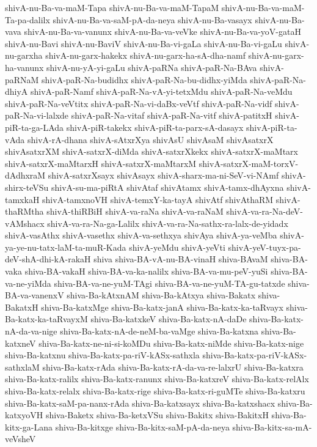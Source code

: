 {shivA-nu-Ba-va-maM-Tapa
shivA-nu-Ba-va-maM-TapaM
shivA-nu-Ba-va-maM-Ta-pa-dalilx
shivA-nu-Ba-va-saM-pA-da-neya
shivA-nu-Ba-vasayx
shivA-nu-Ba-vava
shivA-nu-Ba-va-vanunx
shivA-nu-Ba-va-veVke
shivA-nu-Ba-va-yoV-gataH
shivA-nu-Bavi
shivA-nu-BaviV
shivA-nu-Ba-vi-gaLa
shivA-nu-Ba-vi-gaLu
shivA-nu-garxha
shivA-nu-garx-hakekx
shivA-nu-garx-ha-sA-dha-namf
shivA-nu-garx-ha-vanunx
shivA-nu-yA-yi-gaLu
shivA-paRNa
shivA-paR-Na-BAva
shivA-paRNaM
shivA-paR-Na-budidhx
shivA-paR-Na-bu-didhx-yiMda
shivA-paR-Na-dhiyA
shivA-paR-Namf
shivA-paR-Na-vA-yi-tetxMdu
shivA-paR-Na-veMdu
shivA-paR-Na-veVtitx
shivA-paR-Na-vi-daBx-veVtf
shivA-paR-Na-vidf
shivA-paR-Na-vi-lalxde
shivA-paR-Na-vitaf
shivA-paR-Na-vitf
shivA-patitxH
shivA-piR-ta-ga-LAda
shivA-piR-takekx
shivA-piR-ta-parx-sA-dasayx
shivA-piR-ta-vAda
shivA-rA-dhana
shivA-sAtxrXya
shivAsU
shivAsaM
shivAsatxrX
shivAsatxrXM
shivA-satxrX-diMda
shivA-satxrXkekx
shivA-satxrX-maMtarx
shivA-satxrX-maMtarxH
shivA-satxrX-maMtarxM
shivA-satxrX-maM-torxV-dAdhxraM
shivA-satxrXsayx
shivAsayx
shivA-sharx-ma-ni-SeV-vi-NAmf
shivA-shirx-teVSu
shivA-su-ma-piRtA
shivAtaf
shivAtamx
shivA-tamx-dhAyxna
shivA-tamxkaH
shivA-tamxnoVH
shivA-temxY-ka-tayA
shivAtf
shivAthaRM
shivA-thaRMtha
shivA-thiRBiH
shivA-va-raNa
shivA-va-raNaM
shivA-va-ra-Na-deV-vAMshacx
shivA-va-ra-Na-ga-Lalilx
shivA-va-ra-Na-sathx-ra-lalx-de-yidadx
shivA-vasAthx
shivA-vasethx
shivA-va-sethxya
shivAya
shivA-ya-veMba
shivA-ya-ye-nu-tatx-laM-ta-muR-Kada
shivA-yeMdu
shivA-yeVti
shivA-yeV-tuyx-pa-deV-shA-dhi-kA-rakaH
shiva
shiva-BA-vA-nu-BA-vinaH
shiva-BAvaM
shiva-BA-vaka
shiva-BA-vakaH
shiva-BA-va-ka-nalilx
shiva-BA-va-mu-peV-yuSi
shiva-BA-va-ne-yiMda
shiva-BA-va-ne-yuM-TAgi
shiva-BA-va-ne-yuM-TA-gu-tatxde
shiva-BA-va-vanenxV
shiva-Ba-kAtxnAM
shiva-Ba-kAtxya
shiva-Bakatx
shiva-BakatxH
shiva-Ba-katxMge
shiva-Ba-katx-janA
shiva-Ba-katx-ka-taRvayx
shiva-Ba-katx-ka-taRvayxM
shiva-Ba-katxkeV
shiva-Ba-katx-nA-daDe
shiva-Ba-katx-nA-da-va-nige
shiva-Ba-katx-nA-de-neM-ba-vaMge
shiva-Ba-katxna
shiva-Ba-katxneV
shiva-Ba-katx-ne-ni-si-koMDu
shiva-Ba-katx-niMde
shiva-Ba-katx-nige
shiva-Ba-katxnu
shiva-Ba-katx-pa-riV-kASx-sathxla
shiva-Ba-katx-pa-riV-kASx-sathxlaM
shiva-Ba-katx-rAda
shiva-Ba-katx-rA-da-va-re-lalxrU
shiva-Ba-katxra
shiva-Ba-katx-ralilx
shiva-Ba-katx-ranunx
shiva-Ba-katxreV
shiva-Ba-katx-relAlx
shiva-Ba-katx-relalx
shiva-Ba-katx-rige
shiva-Ba-katx-ri-guMTe
shiva-Ba-katxru
shiva-Ba-katx-saM-pa-nanx-rAda
shiva-Ba-katxsayx
shiva-Ba-katxshacx
shiva-Ba-katxyoVH
shiva-Baketx
shiva-Ba-ketxVSu
shiva-Bakitx
shiva-BakitxH
shiva-Ba-kitx-ga-Lana
shiva-Ba-kitxge
shiva-Ba-kitx-saM-pA-da-neya
shiva-Ba-kitx-sa-mA-veVsheV
}
